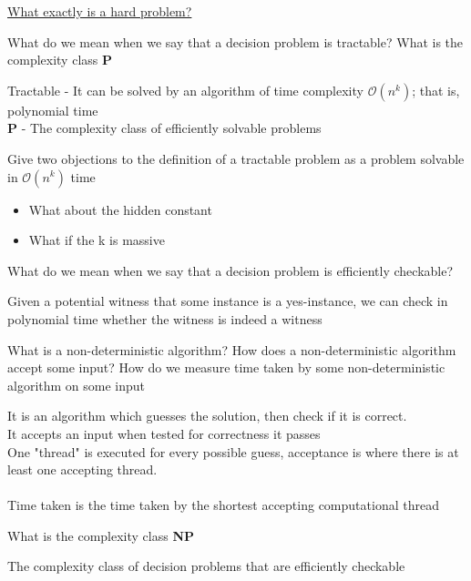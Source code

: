 \documentclass[addpoints]{exam}
\begin{document}
\begin{center}
	\underline{\huge What exactly is a hard problem?}
\end{center}
\begin{questions}
\question[4]What do we mean when we say that a decision problem is tractable? What is the complexity class \textbf{P}
\begin{solution}[2in]
	Tractable - It can be solved by an algorithm of time complexity $\mathcal{O}(n^k)$; that is, polynomial time\\
	\textbf{P} - The complexity class of efficiently solvable problems 
\end{solution}

\question[4]Give two objections to the definition of a tractable problem as a problem solvable in $\mathcal{O}(n^k)$ time
\begin{solution}[2in]
	\begin{itemize}
		\item What about the hidden constant
		\item What if the k is massive
	\end{itemize}
\end{solution}

\question[3]What do we mean when we say that a decision problem is efficiently checkable?
\begin{solution}[2in]
	Given a potential witness that some instance is a yes-instance, we can check in polynomial time whether the witness is indeed a witness
\end{solution}

\question[6]What is a non-deterministic algorithm? How does a non-deterministic algorithm accept some input? How do we measure time taken by some non-deterministic algorithm on some input
\begin{solution}[2in]
	It is an algorithm which guesses the solution, then check if it is correct.\\
	It accepts an input when tested for correctness it passes\\
	One "thread" is executed for every possible guess, acceptance is where there is at least one accepting thread.\\
	\\
	Time taken is the time taken by the shortest accepting computational thread
\end{solution}

\question[2]What is the complexity class \textbf{NP}
\begin{solution}[2in]
	The complexity class of decision problems that are efficiently checkable
\end{solution}


\end{questions}
\end{document}
